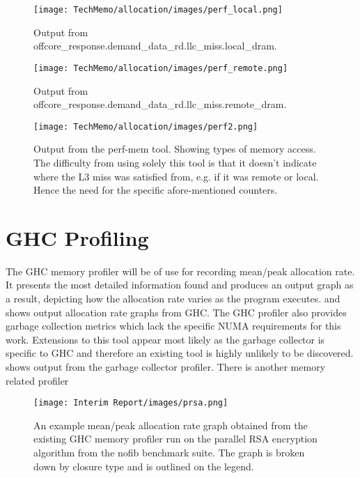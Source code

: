 \documentclass[a4paper,11pt]{article}
\begin{document}
\begin{figure}[!htb]
    \centering
    \texttt{[image: TechMemo/allocation/images/perf\_local.png]}
    \caption{Output from offcore\_response.demand\_data\_rd.llc\_miss.local\_dram.}
    \label{fig:perf_local}
\end{figure}

\begin{figure}[!htb]
    \centering
    \texttt{[image: TechMemo/allocation/images/perf\_remote.png]}
    \caption{Output from offcore\_response.demand\_data\_rd.llc\_miss.remote\_dram.}
    \label{fig:perf_remote}
\end{figure}


\begin{figure}[!htb]
    \centering
    \texttt{[image: TechMemo/allocation/images/perf2.png]}
    \caption{Output from the perf-mem tool. Showing types of memory access. The difficulty from using solely this tool is that it doesn't indicate where the L3 miss was satisfied from, e.g. if it was remote or local. Hence the need for the specific afore-mentioned counters.}
    \label{fig:perf_mem}
\end{figure}


\section{GHC Profiling}

The GHC memory profiler will be of use for recording mean/peak allocation rate. It presents the most detailed information found and produces an output graph as a result, depicting how the allocation rate varies as the program executes.  and  shows output allocation rate graphs from GHC. The GHC profiler also provides garbage collection metrics which lack the specific NUMA requirements for this work. Extensions to this tool appear most likely as the garbage collector is specific to GHC and therefore an existing tool is highly unlikely to be discovered. 
shows output from the garbage collector profiler. There is another memory related profiler

\begin{figure}[!htb]
    \centering
    \texttt{[image: Interim Report/images/prsa.png]}
    \caption{An example mean/peak allocation rate graph obtained from the existing GHC memory profiler run on the parallel RSA encryption algorithm from the nofib benchmark suite. The graph is broken down by closure type and is outlined on the legend.}
    \label{fig:alloc_prsa}
\end{figure}
\end{document}
